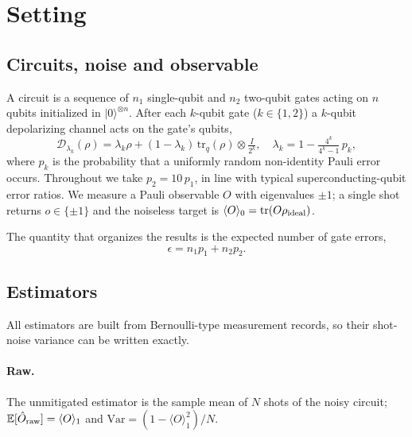 \documentclass[aps,pra,reprint,amsmath,amssymb,nofootinbib,superscriptaddress]{revtex4-2}
\theoremstyle{remark}
\newcommand{\E}{\mathbb{E}}
\newcommand{\Var}{\mathrm{Var}}
\providecommand{\tr}{}\renewcommand{\tr}{\mathrm{tr}}
\newcommand{\eps}{\epsilon}
\begin{document}
\section{Setting}
\label{sec:setting}

\subsection{Circuits, noise and observable}

A circuit is a sequence of $n_1$ single-qubit and $n_2$ two-qubit gates acting on $n$ qubits initialized in $|0\rangle^{\otimes n}$. After each $k$-qubit gate ($k\in\{1,2\}$) a $k$-qubit depolarizing channel acts on the gate's qubits,
\begin{equation}
\mathcal D_{\lambda_k}(\rho)=\lambda_k\rho+(1-\lambda_k)\,\tr_{q}(\rho)\otimes \tfrac{I}{2^k},
\quad \lambda_k = 1-\tfrac{4^k}{4^k-1}\,p_k,
\label{eq:depol}
\end{equation}
where $p_k$ is the probability that a uniformly random non-identity Pauli error occurs. Throughout we take $p_2=10\,p_1$, in line with typical superconducting-qubit error ratios. We measure a Pauli observable $O$ with eigenvalues $\pm1$; a single shot returns $o\in\{\pm1\}$ and the noiseless target is $\langle O\rangle_0 = \tr(O\rho_{\rm ideal})$.

The quantity that organizes the results is the expected number of gate errors,
\begin{equation}
\eps = n_1p_1+n_2p_2 .
\end{equation}

\subsection{Estimators}

All estimators are built from Bernoulli-type measurement records, so their shot-noise variance can be written exactly.

\paragraph{Raw.} The unmitigated estimator is the sample mean of $N$ shots of the noisy circuit; $\E[\hat O_{\rm raw}]=\langle O\rangle_1$ and $\Var = (1-\langle O\rangle_1^2)/N$.
\end{document}

